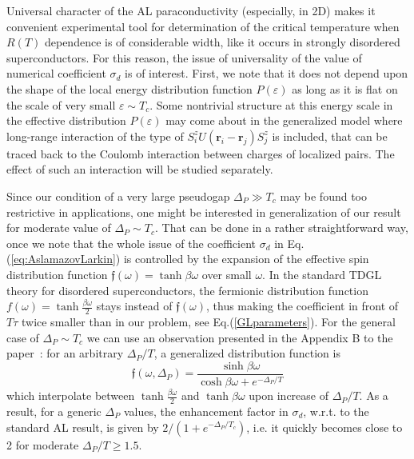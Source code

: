 \documentclass[twocolumn,english,prb]{revtex4-1}
\begin{document}
Universal character of the AL  paraconductivity (especially, in 2D) makes it  convenient experimental tool for
determination of the critical temperature when  $R(T)$ dependence is of considerable width, like it occurs in
strongly disordered superconductors.  For this reason, the issue of universality of the value of numerical coefficient $\sigma_d$ 
is of interest.  First, we note that it does not depend upon the shape of the local energy distribution function
$P(\varepsilon)$ as long as it is flat on the scale of  very small $\varepsilon \sim T_c$.  
Some nontrivial structure at this energy scale in the effective distribution $P(\varepsilon)$ may come about 
in the generalized model where long-range interaction of the
type of $S_i^z U(\boldsymbol{r}_i - \boldsymbol{r}_j) S_j^z$ is included, that can be traced back to the Coulomb interaction
between charges of localized pairs.  The effect of such an interaction will be studied separately.

Since our condition of a very large pseudogap $\Delta_P \gg T_c$ may be found too restrictive in applications, one
might be interested in generalization of our result for moderate value of $\Delta_P \sim T_c$. That can be done in
a rather straightforward way, once we note that the whole issue of the coefficient $\sigma_d$ in Eq.(\ref{eq:AslamazovLarkin})
is controlled by the expansion of the effective spin distribution function $\mathfrak{f}(\omega) = \tanh \beta \omega$ over
small $\omega$. In the standard TDGL theory \cite{VarlamovLarkin} for disordered superconductors, the  fermionic
distribution function $ f(\omega) = \tanh \frac{\beta \omega}{2}$ stays instead of $\mathfrak{f}(\omega) $, thus making the
coefficient in front of $T\tau$ twice smaller than in our problem, see Eq.(\ref{GLparameters}).
For the general case of $\Delta_P \sim T_c$ we can use an observation presented in the Appendix B to the paper~\cite{t2}: 
for an arbitrary $\Delta_P/T$, a generalized distribution function is
\begin{equation}
\mathfrak{f}(\omega,\Delta_P) = \frac{\sinh \beta\omega}{\cosh\beta\omega + e^{-\Delta_P/T}}
\nonumber
\end{equation}
which interpolate between $\tanh\frac{\beta \omega}{2}$ and  $\tanh \beta \omega$ upon increase of $\Delta_P/T$.
As a result,  for a generic $\Delta_P$ values, the enhancement factor in $\sigma_d$,
 w.r.t. to the standard AL result, is given by
$ 2/(1 + e^{-\Delta_P/T_c}) $, i.e. it quickly becomes close to 2 for moderate $\Delta_P/T \geq 1.5$.
\end{document}
